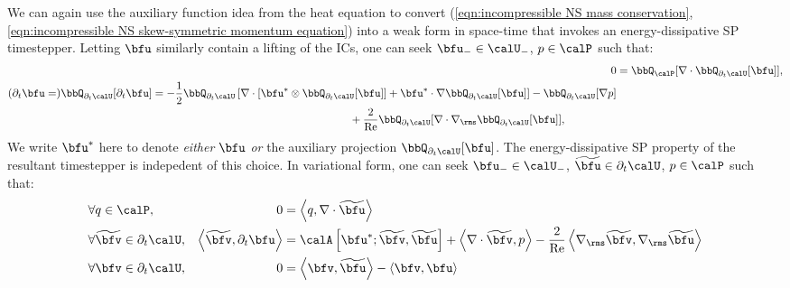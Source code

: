     We can again use the auxiliary function idea from the heat equation to convert (\ref{eqn:incompressible NS mass conservation}, \ref{eqn:incompressible NS skew-symmetric momentum equation}) into a weak form in space-time that invokes an energy-dissipative SP timestepper. Letting $\bfu$ similarly contain a lifting of the ICs, one can seek $\bfu_{-} \in \calU_{-}$, $p \in \calP$ such that: 
    \begin{align}
                                                                            0  &=  \bbQ_{\calP}[\nabla\cdot\bbQ_{\partial_{t}\calU}[\bfu]],  \label{eqn:incompressible NS weak form 1}  \\
        \begin{split}
            (\partial_{t}\bfu  =)  \bbQ_{\partial_{t}\calU}[\partial_{t}\bfu]  &=  - \frac{1}{2}\bbQ_{\partial_{t}\calU}\left[\nabla\cdot\left[\bfu^{*}\otimes\bbQ_{\partial_{t}\calU}[\bfu]\right] + \bfu^{*}\cdot\nabla\bbQ_{\partial_{t}\calU}[\bfu]\right] - \bbQ_{\partial_{t}\calU}[\nabla p]  \\
                                                                               &\qquad\qquad\qquad\qquad\qquad\qquad\qquad\qquad\qquad+ \frac{2}{\rmRe}\bbQ_{\partial_{t}\calU}[\nabla\cdot\nabla_{\rms}\bbQ_{\partial_{t}\calU}[\bfu]],
        \end{split}  \label{eqn:incompressible NS weak form 2}
    \end{align}
    We write $\bfu^{*}$ here to denote \emph{either} $\bfu$ \emph{or} the auxiliary projection $\bbQ_{\partial_{t}\calU}[\bfu]$. The energy-dissipative SP property of the resultant timestepper is indepedent of this choice. In variational form, one can seek $\bfu_{-} \in \calU_{-}$, $\widetilde{\bfu} \in \partial_{t}\calU$, $p \in \calP$ such that:
    \begin{align}
        &\forall                 q  \in  \calP,              &                                                            0  &=  \left\langle q, \nabla\cdot\widetilde{\bfu}\right\rangle  \\
        &\forall  \widetilde{\bfv}  \in  \partial_{t}\calU,  &  \left\langle\widetilde{\bfv}, \partial_{t}\bfu\right\rangle  &=  \calA\left[\bfu^{*}; \widetilde{\bfv}, \widetilde{\bfu}\right] + \left\langle\nabla\cdot\widetilde{\bfv}, p\right\rangle - \frac{2}{\rmRe}\left\langle\nabla_{\rms}\widetilde{\bfv}, \nabla_{\rms}\widetilde{\bfu}\right\rangle  \\
        &\forall              \bfv  \in  \partial_{t}\calU,  &                                                            0  &=  \left\langle\bfv, \widetilde{\bfu}\right\rangle - \left\langle\bfv, \bfu\right\rangle
    \end{align}
